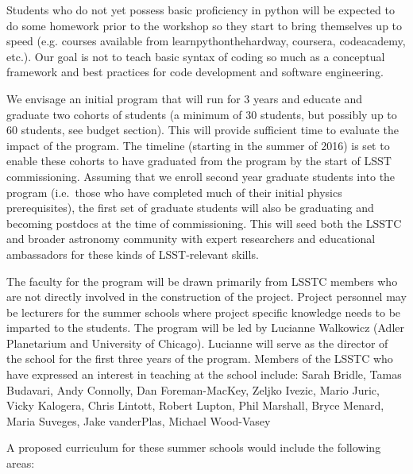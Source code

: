 \documentclass[nofootbib,floatfix,11pt]{article}
\begin{document}
Students who do not yet possess basic proficiency in python will be expected to do some homework prior to the workshop so they start to bring themselves up to speed (e.g. courses available from learnpythonthehardway, coursera, codeacademy, etc.). Our goal is not to teach basic syntax of coding so much as a conceptual framework and best practices for code development and software engineering. 


We envisage an initial program that will run for 3 years and educate and graduate two cohorts of students (a minimum of 30 students, but possibly up to 60 students, see budget section). This will provide sufficient time to evaluate the impact of the program. The timeline (starting in the summer of  2016) is set to enable these cohorts to have graduated from the program by the start of LSST commissioning. Assuming that we enroll second year graduate students into the program (i.e.\ those who have completed much of their initial physics prerequisites), the first set of graduate students will also be graduating and becoming postdocs at the time of commissioning. This will seed both the LSSTC and broader astronomy community with expert researchers and educational ambassadors for these kinds of LSST-relevant skills.


The faculty for the program will be drawn primarily from LSSTC members who are not directly involved in the construction of the project. Project personnel may be lecturers for the summer schools where project specific knowledge needs to be imparted to the students. The program will be led by Lucianne Walkowicz (Adler Planetarium and University of Chicago). Lucianne will serve as the director of the school for the first three years of the program. Members of the LSSTC who have expressed an interest in teaching at the school include: Sarah Bridle, Tamas Budavari, Andy Connolly, Dan Foreman-MacKey, Zeljko Ivezic, Mario Juric, Vicky Kalogera, Chris Lintott, Robert Lupton, Phil Marshall, Bryce Menard, Maria Suveges, Jake vanderPlas, Michael Wood-Vasey


A proposed curriculum for these summer schools would include the following areas: 
\end{document}
